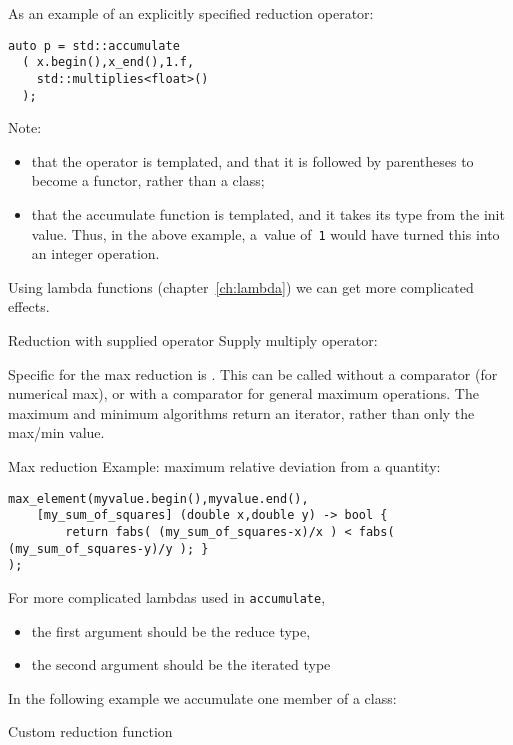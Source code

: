 As an example of an explicitly specified reduction operator:
\begin{lstlisting}
auto p = std::accumulate
  ( x.begin(),x_end(),1.f,
    std::multiplies<float>()
  );
\end{lstlisting}
Note:
\begin{itemize}
\item that the operator is templated,
  and that it is followed by parentheses
  to become a functor, rather than a class;
\item that the accumulate function is templated,
  and it takes its type from the init value.
  Thus, in the above example, a~value of~\lstinline+1+
  would have turned this into an integer operation.
\end{itemize}

Using lambda functions (chapter~\ref{ch:lambda})
we can get more complicated effects.

\begin{block}{Reduction with supplied operator}
  \label{sl:vec-multiplies}
  Supply multiply operator:
\end{block}

Specific for the max reduction is .
This can be called without a comparator (for numerical max),
or with a comparator for general maximum operations.
The maximum and minimum algorithms return an iterator,
rather than only the max/min value.

\begin{block}{Max reduction}
  Example: maximum relative deviation from a quantity:
\begin{lstlisting}
max_element(myvalue.begin(),myvalue.end(),
    [my_sum_of_squares] (double x,double y) -> bool {
        return fabs( (my_sum_of_squares-x)/x ) < fabs( (my_sum_of_squares-y)/y ); }
);
\end{lstlisting}
\end{block}

For more complicated lambdas used in \lstinline{accumulate},
\begin{itemize}
\item the first argument should be the reduce type,
\item the second argument should be the iterated type
\end{itemize}
In the following example we accumulate one member
of a class:

\begin{block}{Custom reduction function}
  \label{sl:reduce-icomp}
  \begin{multicols}{2}
    \columnbreak
  \end{multicols}
\end{block}

